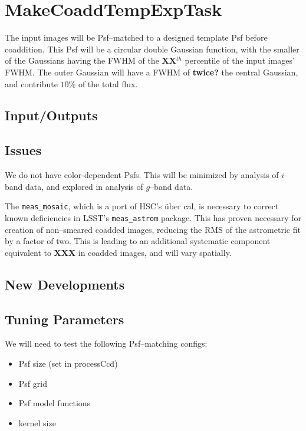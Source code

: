 \documentclass[12pt]{article}
\begin{document}

\clearpage 
\section{MakeCoaddTempExpTask} 

The input images will be Psf--matched to a designed template Psf
before coaddition.  This Psf will be a circular double Gaussian
function, with the smaller of the Gaussians having the FWHM of the
{\bf XX}$^{th}$ percentile of the input images' FWHM.  The outer
Gaussian will have a FWHM of {\bf twice?} the central Gaussian, and
contribute {\bf $10\%$} of the total flux.

\subsection{Input/Outputs}

\subsection{Issues}
We do not have color-dependent Psfs.  This will be minimized by
analysis of $i$--band data, and explored in analysis of $g$--band
data.

The {\tt meas\_mosaic}, which is a port of HSC's \"{u}ber cal, is
necessary to correct known deficiencies in LSST's {\tt meas\_astrom}
package.  This has proven necessary for creation of non--smeared
coadded images, reducing the RMS of the astrometric fit by a factor of
two.  This is leading to an additional systematic component equivalent
to {\bf XXX} in coadded images, and will vary spatially.

\subsection{New Developments}

\subsection{Tuning Parameters}
We will need to test the following Psf--matching configs:
\begin{itemize}
\item Psf size (set in processCcd)
\item Psf grid 
\item Psf model functions
\item kernel size
\end{itemize}
\end{document}

